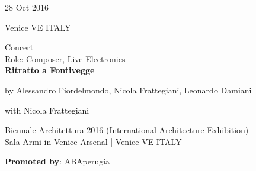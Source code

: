 \documentclass[7pt,a4paper]{article}
\begin{document}
\begin{mdframed}[
    backgroundcolor=white,
    linecolor=white,
    linewidth=0pt,
    innerleftmargin=6pt,
    innerrightmargin=6pt,
    innertopmargin=6pt,
    innerbottommargin=6pt,
    skipabove=0pt,
    skipbelow=0pt
]

\begin{minipage}[t]{0.28\textwidth}

28 Oct 2016

\scriptsize Venice VE ITALY


\end{minipage}
\begin{minipage}[t]{0.68\textwidth}
\small Concert
\\\scriptsize Role: Composer, Live Electronics
\\ \normalsize \textbf{Ritratto a Fontivegge}
\par\scriptsize by Alessandro Fiordelmondo, Nicola Frattegiani, Leonardo Damiani
\par\scriptsize with Nicola Frattegiani
\vspace{0.25cm}



\small Biennale Architettura 2016 (International Architecture Exhibition)\\Sala Armi in Venice Arsenal | \scriptsize Venice VE ITALY

\vspace{0.1cm}
\scriptsize

\vspace{0.1cm}
\par \textbf{Promoted by}: ABAperugia
\end{minipage}
\vspace{0.25cm}
\end{mdframed}
\end{document}
